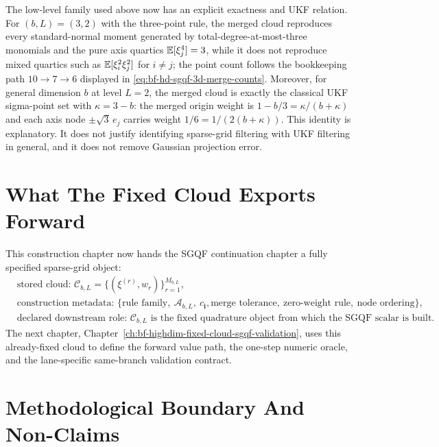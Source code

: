 The low-level family used above now has an explicit exactness and UKF
relation.  For $(b,L)=(3,2)$ with the three-point rule, the merged cloud
reproduces every standard-normal moment generated by total-degree-at-most-three
monomials and the pure axis quartics $\mathbb{E}[\xi_j^4]=3$, while it does not
reproduce mixed quartics such as $\mathbb{E}[\xi_i^2\xi_j^2]$ for $i\ne j$; the point
count follows the bookkeeping path $10\to7\to6$ displayed in
\eqref{eq:bf-hd-sgqf-3d-merge-counts}.  Moreover, for general dimension $b$ at
level $L=2$, the merged cloud is exactly the classical UKF sigma-point set with
$\kappa=3-b$: the merged origin weight is $1-b/3=\kappa/(b+\kappa)$ and each
axis node $\pm\sqrt3\,e_j$ carries weight $1/6=1/(2(b+\kappa))$.  This identity
is explanatory.  It does not justify identifying sparse-grid filtering with UKF
filtering in general, and it does not remove Gaussian projection error.

\section{What The Fixed Cloud Exports Forward}
\label{sec:bf-hd-sgqf-exports}

This construction chapter now hands the SGQF continuation chapter a fully
specified sparse-grid object:
\begin{equation}
\begin{aligned}
  &\text{stored cloud: } \mathcal C_{b,L}=\{(\xi^{(r)},w_r)\}_{r=1}^{M_{b,L}},\\
  &\text{construction metadata: } \{\text{rule family},\ \mathcal A_{b,L},\ c_{\mathbf i},
  \text{merge tolerance},\ \text{zero-weight rule},\ \text{node ordering}\},\\
  &\text{declared downstream role: } \mathcal C_{b,L}
  \text{ is the fixed quadrature object from which the SGQF scalar is built.}
\end{aligned}
  \label{eq:bf-hd-sgqf-construction-export}
\end{equation}
The next chapter,
Chapter~\ref{ch:bf-highdim-fixed-cloud-sgqf-validation}, uses this already-fixed
cloud to define the forward value path, the one-step numeric oracle, and the
lane-specific same-branch validation contract.

\section{Methodological Boundary And Non-Claims}
\label{sec:bf-hd-sgqf-boundary}

